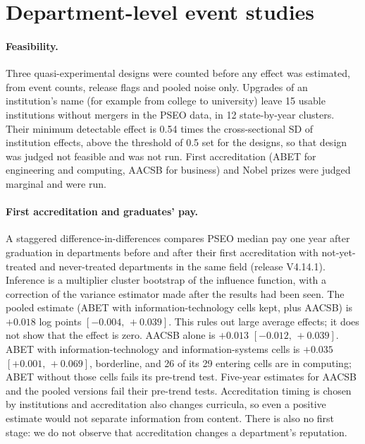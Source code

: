 \documentclass[11pt]{article}
\newcommand{\ci}[2]{$[#1,\allowbreak\,#2]$}
\begin{document}
\section{Department-level event studies}\label{sec:si-events}

\paragraph{Feasibility.} Three quasi-experimental designs were counted before any effect was
estimated, from event counts, release flags and pooled noise only. Upgrades of an institution's name (for example
from college to university) leave 15 usable institutions without mergers in the PSEO data, in 12 state-by-year
clusters. Their minimum detectable effect is 0.54 times the cross-sectional SD of institution effects, above the
threshold of 0.5 set for the designs, so that design was judged not feasible and was not run. First accreditation (ABET for engineering and computing, AACSB for business) and Nobel prizes were judged
marginal and were run.

\paragraph{First accreditation and graduates' pay.} A staggered difference-in-differences
\citep{callaway2021difference} compares PSEO median pay one year after graduation in departments before and after
their first accreditation with not-yet-treated and never-treated departments in the same field (release V4.14.1).
Inference is a multiplier cluster bootstrap of the influence function, with a correction of the variance estimator
made after the results had been seen. The pooled estimate (ABET with information-technology cells kept, plus
AACSB) is $+0.018$ log points \ci{-0.004}{+0.039}. This rules out large average effects; it does not show that the
effect is zero. AACSB alone is $+0.013$ \ci{-0.012}{+0.039}. ABET with
information-technology and information-systems cells is $+0.035$ \ci{+0.001}{+0.069}, borderline, and 26 of its 29
entering cells are in computing; ABET without those cells fails its pre-trend test. Five-year estimates for AACSB
and the pooled versions fail their pre-trend tests. Accreditation timing is chosen by institutions and accreditation
also changes curricula, so even a positive estimate would not separate information from content. There is also no
first stage: we do not observe that accreditation changes a department's reputation.
\end{document}
